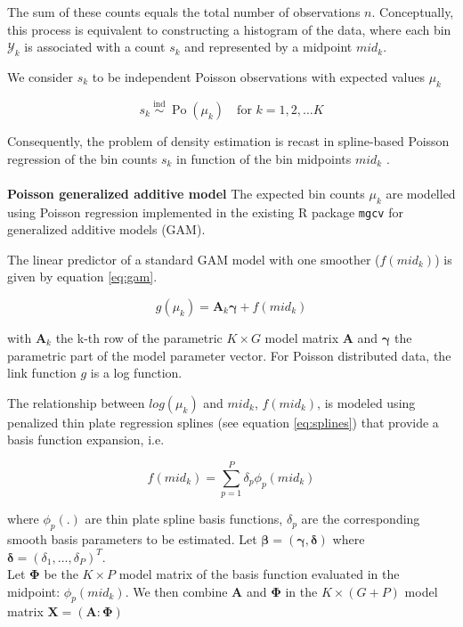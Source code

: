 The sum of these counts equals the total number of observations $n$. Conceptually, this process is equivalent to constructing a histogram of the data, where each bin $\mathcal{Y}_k$ is associated with a count $s_k$ and represented by a midpoint $mid_k$.

We consider $s_k$ to be independent Poisson observations with expected values $\mu_k$

\begin{equation}
    s_k \stackrel{\text { ind }}{\sim}
    \operatorname{Po}\left(\mu_k\right) \quad 
    \text{for } k=1,2, \ldots K
    \label{eq:poisson}
\end{equation}

Consequently, the problem of density estimation is recast in spline-based Poisson regression of the bin counts $s_k$ in function of the bin midpoints $mid_k$ \cite{efron}.
\\
\\
\textbf{Poisson generalized additive model}
The expected bin counts $\mu_k$ are modelled using Poisson regression implemented in the existing R package \texttt{mgcv} \cite{mgcv} for generalized additive models (GAM). 

The linear predictor of a standard GAM model with one smoother ($f(mid_k)$) is given by equation \ref{eq:gam}.

\begin{equation}
    g(\mu_k) = \boldsymbol{A}_k\boldsymbol{\gamma} + f(mid_k)
    \label{eq:gam}
\end{equation}

with $\boldsymbol{A}_k$ the k-th row of the parametric $K \times G$ model matrix $\boldsymbol{A}$ and $\boldsymbol{\gamma}$ the parametric part of the model parameter vector. For Poisson distributed data, the link function $g$ is a log function.

The relationship between $log(\mu_k)$ and $mid_k$, $f(mid_k)$, is modeled using penalized thin plate regression splines (see equation \ref{eq:splines}) that provide a basis function expansion, i.e.

\begin{equation}
    f(mid_k) = \sum_{p=1}^{P}\delta_p\phi_p(mid_k)
    \label{eq:splines}
\end{equation}

where $\phi_p(.)$ are thin plate spline basis functions, $\delta_p$ are the corresponding smooth basis parameters to be estimated. Let $\boldsymbol{{\beta}} = (\boldsymbol{\gamma},\boldsymbol{\delta})$ where $\boldsymbol{\delta} = (\delta_1,\dots, \delta_P)^T$.\\
Let $\boldsymbol{\Phi}$ be the $K \times P$ model matrix of the basis function evaluated in the midpoint: $\phi_p(mid_k)$.
We then combine $\boldsymbol{A}$ and $\boldsymbol{\Phi}$ in the $K \times (G+P)$ model matrix $\boldsymbol{X} = (\boldsymbol{A} : \boldsymbol{\Phi})$

